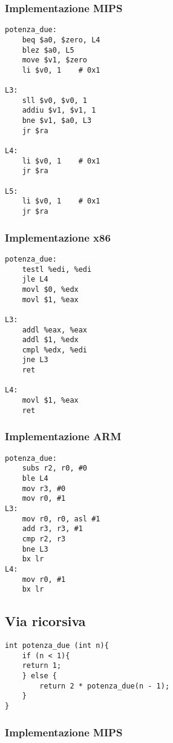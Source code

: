 \documentclass[class=book, crop=false, oneside]{standalone}
\begin{document}
\subsubsection{Implementazione MIPS}

\begin{verbatim}
potenza_due:
	beq $a0, $zero, L4
	blez $a0, L5
	move $v1, $zero
	li $v0, 1	 # 0x1

L3:
	sll $v0, $v0, 1
	addiu $v1, $v1, 1
	bne $v1, $a0, L3
	jr $ra

L4:
	li $v0, 1	 # 0x1
	jr $ra

L5:
	li $v0, 1	 # 0x1
	jr $ra
\end{verbatim}

\subsubsection{Implementazione x86}

\begin{verbatim}
potenza_due:
	testl %edi, %edi
	jle L4
	movl $0, %edx
	movl $1, %eax

L3:
	addl %eax, %eax
	addl $1, %edx
	cmpl %edx, %edi
	jne L3
	ret

L4:
	movl $1, %eax
	ret
\end{verbatim}

\subsubsection{Implementazione ARM}

\begin{verbatim}
potenza_due:
	subs r2, r0, #0
	ble L4
	mov r3, #0
	mov r0, #1
L3:
	mov r0, r0, asl #1
	add r3, r3, #1
	cmp r2, r3
	bne L3
	bx lr
L4:
	mov r0, #1
	bx lr
\end{verbatim}

\subsection*{Via ricorsiva}

\begin{verbatim}
int potenza_due (int n){
	if (n < 1){
	return 1;
	} else {
		return 2 * potenza_due(n - 1);
	}
}
\end{verbatim}

\subsubsection{Implementazione MIPS}
\end{document}
